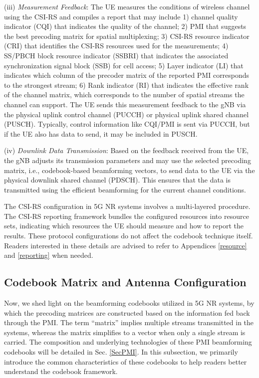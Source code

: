 \documentclass[lettersize,journal]{IEEEtran}
\begin{document}
(iii) {\emph{Measurement Feedback}}: The UE measures the conditions of wireless channel using the CSI-RS and compiles a report that may include 1) channel quality indicator (CQI) that indicates the quality of the channel; 2) PMI that suggests the best precoding matrix for spatial multiplexing; 3) CSI-RS resource indicator (CRI) that identifies the CSI-RS resources used for the measurements; 4) SS/PBCH block resource indicator (SSBRI) that indicates the associated synchronization signal block (SSB) for cell access; 5) Layer indicator (LI) that indicates which column of the precoder matrix of the reported PMI corresponds to the strongest stream; 6) Rank indicator (RI) that indicates the effective rank of the channel matrix, which corresponds to the number of spatial streams the channel can support. The UE sends this measurement feedback to the gNB via the physical uplink control channel (PUCCH) or physical uplink shared channel (PUSCH). Typically, control information like CQI/PMI is sent via PUCCH, but if the UE also has data to send, it may be included in PUSCH.

(iv) {\emph{Downlink Data Transmission}}: Based on the feedback received from the UE, the gNB adjusts its transmission parameters and may use the selected precoding matrix, i.e., codebook-based beamforming vectors, to send data to the UE via the physical downlink shared channel (PDSCH). This ensures that the data is transmitted using the efficient beamforming for the current channel conditions.


The CSI-RS configuration in 5G NR systems involves a multi‑layered procedure. The CSI‑RS reporting framework bundles the configured resources into resource sets, indicating which resources the UE should measure and how to report the results. These protocol configurations do not affect the codebook technique itself. Readers interested in these details are advised to refer to Appendices \ref{resource} and \ref{reporting} when needed. 







\subsection{Codebook Matrix and Antenna Configuration}
Now, we shed light on the beamforming codebooks utilized in 5G NR systems, by which the precoding matrices are constructed based on the information fed back through the PMI. The term ``matrix'' implies multiple streams transmitted in the systems, whereas the matrix simplifies to a vector when only a single stream is carried. The composition and underlying technologies of these PMI beamforming codebooks will be detailed in Sec. \ref{SecPMI}. In this subsection, we primarily introduce the common characteristics of these codebooks to help readers better understand the codebook framework.
\end{document}
